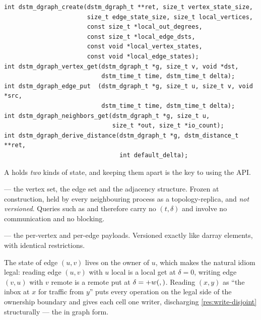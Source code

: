 \begin{lstlisting}
int dstm_dgraph_create(dstm_dgraph_t **ret, size_t vertex_state_size,
                       size_t edge_state_size, size_t local_vertices,
                       const size_t *local_out_degrees,
                       const size_t *local_edge_dsts,
                       const void *local_vertex_states,
                       const void *local_edge_states);
int dstm_dgraph_vertex_get(dstm_dgraph_t *g, size_t v, void *dst,
                           dstm_time_t time, dstm_time_t delta);
int dstm_dgraph_edge_put  (dstm_dgraph_t *g, size_t u, size_t v, void *src,
                           dstm_time_t time, dstm_time_t delta);
int dstm_dgraph_neighbors_get(dstm_dgraph_t *g, size_t u,
                              size_t *out, size_t *io_count);
int dstm_dgraph_derive_distance(dstm_dgraph_t *g, dstm_distance_t **ret,
                                int default_delta);
\end{lstlisting}

A  holds \emph{two} kinds of state, and keeping them apart is the key to
using the API.

\begin{description}[leftmargin=1.3cm,style=nextline,font=\normalfont\bfseries]
\item[Topology] --- the vertex set, the edge set and the adjacency structure.
  Frozen at construction, held by every neighbouring \gls{process} as a
  \gls{topology-replica}, and \emph{not versioned}. Queries such as  and
   therefore carry no $(t, \delta)$ and involve no
  communication and no blocking.
\item[State] --- the per-vertex and per-edge payloads. Versioned exactly like
  darray elements, with identical restrictions.
\end{description}

\begin{remark}\label{rem:edge-ownership}
The state of edge $(u,v)$ lives on the owner of $u$, which makes the natural
idiom legal: reading edge $(u,v)$ with $u$ local is a local get at $\delta =
0$, writing edge $(v,u)$ with $v$ remote is a remote put at $\delta =
+w(,)$. Reading $(x,y)$ as ``the inbox at $x$ for traffic from $y$'' puts
every \gls{operation} on the legal side of the ownership boundary and gives
each \gls{cell} one writer, discharging \cref{res:write-disjoint} structurally
--- the  in graph form.
\end{remark}

